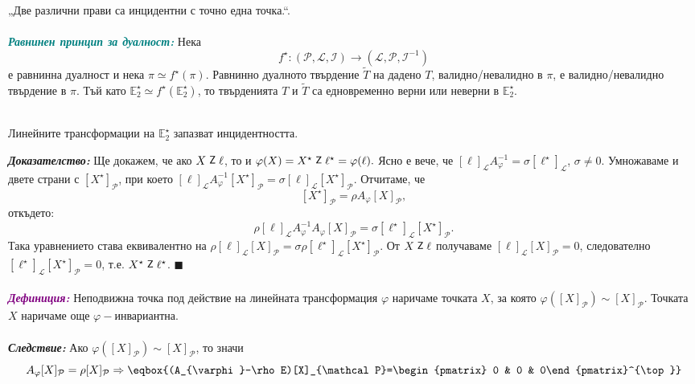 \documentclass[12pt]{article}
\newcommand{\inc}{\mathrel{\raisebox{0.18ex}{\small$\mathsf{Z}$}}}
\begin{document}
„Две различни прави са инцидентни с точно една точка.“.
\\
\\
\textbf{\textit{\textcolor{teal}{Равнинен принцип за дуалност:}}} Нека
\[
f^\star: (\mathcal P, \mathcal L, \mathcal I)
\to (\mathcal L, \mathcal P, \mathcal I^{-1})
\]
е равнинна дуалност и нека $\pi \simeq f^\star(\pi)$.
Равнинно дуалното твърдение $\tilde T$ на дадено $T$,
валидно/невалидно в $\pi$, е валидно/невалидно твърдение в $\pi$. Тъй като $\mathbb{E}_2^\star \simeq f^\star(\mathbb{E}_2^\star)$,
то твърденията $T$ и $\tilde T$
са едновременно верни или неверни в $\mathbb{E}_2^\star$.\\
\\
\begin{tcolorbox}[
    colback=blue!5,    %
    colframe=blue!75!black, %
    title={\textbf{Твърдение 8:}}, %
    fonttitle=\bfseries,
    boxrule=0.8pt,
    arc=1mm,           %
    top=2mm, bottom=2mm, left=3mm, right=3mm
]  Линейните трансформации на $\mathbb{E}_2^\star$ запазват инцидентността.
\end{tcolorbox}
\textbf{\textit{Доказателство:}} Ще докажем, че ако $X\inc \ell$, то и $\varphi(X)=X^\star\inc\ell^\star= \varphi(\ell).$ Ясно е вече, че $[\ell]_{\mathcal L} A_{\varphi}^{-1}=\sigma[\ell^\star]_{\mathcal {L}}$, $\sigma\neq 0$. Умножаваме и двете страни с $[X^\star]_{\mathcal P}$, при което $[\ell]_{\mathcal L} A_{\varphi}^{-1}[X^\star]_{\mathcal P}=\sigma[\ell]_{\mathcal L} [X^\star]_{\mathcal P}$. Отчитаме, че $$[X^\star]_{\mathcal P}=\rho A_{\varphi}[X]_{\mathcal P},$$ откъдето: $$\rho[\ell]_{\mathcal L} A_{\varphi}^{-1} A_{\varphi}[X]_{\mathcal P}=\sigma[\ell^\star]_{\mathcal L} [X^\star]_{\mathcal P}.$$ Така уравнението става еквивалентно на $\rho[\ell]_{\mathcal L}[X]_{\mathcal P}=\sigma\rho[\ell^\star]_{\mathcal L}[X^\star]_{\mathcal P}$. От $X\inc\ell$ получаваме $[\ell]_{\mathcal L} [X]_{\mathcal P}=0$, следователно $[\ell^\star]_{\mathcal L} [X^\star]_{\mathcal P}=0$, т.е. $X^\star\inc\ell^\star$. $\blacksquare$ 
\\
\\
\textbf{\textit{\textcolor{purple}{Дефиниция:}}} Неподвижна точка под действие на линейната трансформация $\varphi$ наричаме точката $X$, за която $\varphi([X]_{\mathcal P})\sim [X]_{\mathcal P}$. Точката $X$ наричаме още $\varphi-$инвариантна.\\
\\
\textbf{\textit{Следствие:}} Ако $\varphi([X]_{\mathcal P})\sim [X]_{\mathcal P}$, то значи $$A_{\varphi}[X]_{\mathcal P}=\rho [X]_{\mathcal P}\Rightarrow\eqbox{(A_{\varphi}-\rho E)[X]_{\mathcal P}=\begin{pmatrix} 0 & 0 & 0\end{pmatrix}^{\top}}$$
\end{document}
